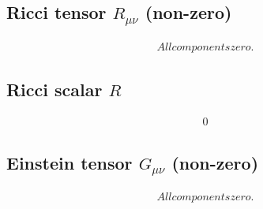 \documentclass{article}
\begin{document}
\subsection{Ricci tensor $R_{\mu\nu}$ (non-zero)}
\begin{align}
All components zero.
\end{align}

\subsection{Ricci scalar $R$}
\begin{align}
0
\end{align}

\subsection{Einstein tensor $G_{\mu\nu}$ (non-zero)}
\begin{align}
All components zero.
\end{align}
\end{document}
